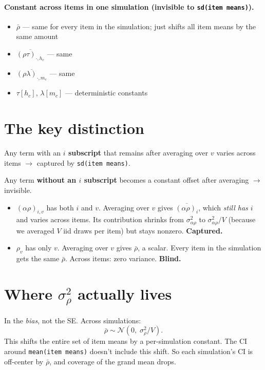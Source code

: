 \documentclass[11pt]{article}
\begin{document}
\paragraph{Constant across items in one simulation (invisible to \texttt{sd(item means)}).}
\begin{itemize}
  \item $\bar\rho$ --- same for every item in the simulation; just shifts all item means by the same amount
  \item $\overline{(\rho\tau)_{\cdot,h_c}}$ --- same
  \item $\overline{(\rho\lambda)_{\cdot,m_c}}$ --- same
  \item $\tau[h_c]$, $\lambda[m_c]$ --- deterministic constants
\end{itemize}

\section*{The key distinction}

Any term with an \textbf{$i$ subscript} that remains after averaging over $v$ varies across items $\longrightarrow$ captured by \texttt{sd(item means)}.

Any term \textbf{without an $i$ subscript} becomes a constant offset after averaging $\longrightarrow$ invisible.

\begin{itemize}
  \item $(\alpha\rho)_{i,v}$ has both $i$ and $v$. Averaging over $v$ gives $\overline{(\alpha\rho)_i}$, which \emph{still has $i$} and varies across items. Its contribution shrinks from $\sigma^2_{\alpha\rho}$ to $\sigma^2_{\alpha\rho} / V$ (because we averaged $V$ iid draws per item) but stays nonzero. \textbf{Captured.}
  \item $\rho_v$ has only $v$. Averaging over $v$ gives $\bar\rho$, a scalar. Every item in the simulation gets the same $\bar\rho$. Across items: zero variance. \textbf{Blind.}
\end{itemize}

\section*{Where $\sigma^2_\rho$ actually lives}

In the \emph{bias}, not the SE. Across simulations:
\[
\bar\rho \sim \mathcal{N}\!\left(0, \; \sigma^2_\rho / V\right).
\]
This shifts the entire set of item means by a per-simulation constant. The CI around \texttt{mean(item means)} doesn't include this shift. So each simulation's CI is off-center by $\bar\rho$, and coverage of the grand mean drops.
\end{document}
